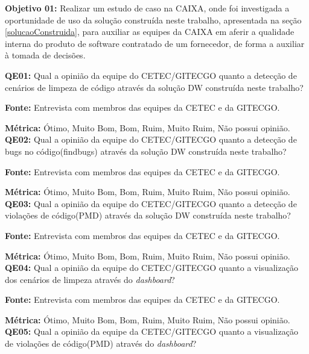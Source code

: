 \textbf{Objetivo 01:} Realizar um estudo de caso na CAIXA, onde foi investigada a oportunidade de uso da solução construída neste trabalho, apresentada na seção \ref{solucaoConstruida}, para auxiliar as equipes da CAIXA em aferir a qualidade interna do produto de software contratado de um fornecedor, de forma a auxiliar à tomada de decisões.


\textbf{QE01:} Qual a opinião da equipe do CETEC/GITECGO quanto a detecção de cenários de limpeza de código através da solução DW construída neste trabalho?

\textbf{Fonte:} Entrevista com membros das equipes da CETEC e da GITECGO.

\textbf{Métrica:} Ótimo, Muito Bom, Bom, Ruim, Muito Ruim, Não possui opinião. \\



\textbf{QE02: } Qual a opinião da equipe do CETEC/GITECGO quanto a detecção de bugs no código(findbugs) através da solução DW construída neste trabalho?

\textbf{Fonte:} Entrevista com membros das equipes da CETEC e da GITECGO.

\textbf{Métrica:} Ótimo, Muito Bom, Bom, Ruim, Muito Ruim, Não possui opinião.\\



\textbf{QE03: } Qual a opinião da equipe do CETEC/GITECGO quanto a detecção de violações de código(PMD) através da solução DW construída neste trabalho?

\textbf{Fonte:} Entrevista com membros das equipes da CETEC e da GITECGO.

\textbf{Métrica:} Ótimo, Muito Bom, Bom, Ruim, Muito Ruim, Não possui opinião.\\



\textbf{QE04: } Qual a opinião da equipe do CETEC/GITECGO quanto a visualização dos cenários  de limpeza através do \textit{dashboard}?

\textbf{Fonte:} Entrevista com membros das equipes da CETEC e da GITECGO.

\textbf{Métrica:} Ótimo, Muito Bom, Bom, Ruim, Muito Ruim, Não possui opinião.\\



\textbf{QE05: } Qual a opinião da equipe da CETEC/GITECGO quanto a visualização de violações de código(PMD) através do \textit{dashboard}?

